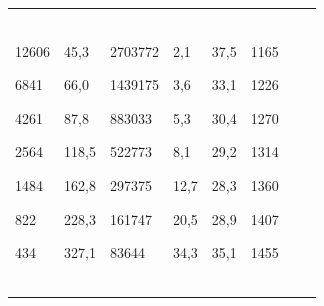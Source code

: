 \begin{table}[h!]
\begin{minipage} [t]{15.8cm}
\begin{tabular}{p{45pt}|p{45pt}|p{45pt}|p{45pt}|p{45pt}|p{45pt}|p{45pt}|p{35pt}}
12606 \par 6841 \par 4261 \par 2564 \par 1484 \par 822 \par 434& \centering

45,3 \par 66,0 \par 87,8 \par 118,5 \par 162,8 \par 228,3 \par 327,1& \centering

2703772 \par 1439175 \par 883033 \par 522773 \par 297375 \par 161747 \par 83644&\centering 

2,1 \par 3,6 \par 5,3 \par 8,1 \par 12,7 \par 20,5 \par 34,3& \centering

37,5 \par 33,1 \par 30,4 \par 29,2 \par 28,3 \par 28,9 \par 35,1& \centering

1165 \par 1226 \par 1270 \par 1314 \par 1360 \par 1407 \par 1455&

{\,}\par{\,}\par{\,}\par{\,}\par

{\,}\par{\,}\par{\,}\par{\,}\par


\end{tabular}
\end{minipage}
\end{table}
